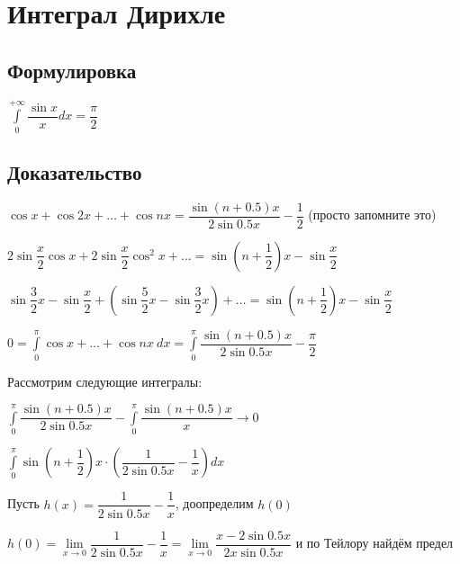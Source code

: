 \documentclass{article}
\begin{document}
    \newpage
    
    \section{Интеграл Дирихле}
    
        \subsection{Формулировка}
        
            $\int\limits^{+\infty}_0 \dfrac{\sin{x}}{x} dx = \dfrac{\pi}{2}$
            
        \subsection{Доказательство}
        
            $\cos{x} + \cos{2x} + \ldots + \cos{nx} = \dfrac{\sin{(n + 0.5)} x}{2 \sin{0.5 x}} - \dfrac{1}{2}$ (просто запомните это)
            
            $2 \sin {\dfrac{x}{2}} \cos{x} + 2 \sin{\dfrac{x}{2}} \cos^2{x} + \ldots = \sin{\left(n + \dfrac{1}{2} \right)}x - \sin{\dfrac{x}{2}}$
            
            $\sin {\dfrac{3}{2}x} - \sin {\dfrac{x}{2}} + \left( \sin {\dfrac{5}{2}} x - \sin {\dfrac{3}{2}} x \right) + \ldots = \sin {\left(n + \dfrac{1}{2} \right)x} - \sin {\dfrac{x}{2}}$
            
            $0 = \int\limits^{\pi}_0 \cos{x} + \ldots + \cos{nx} \ dx = \int\limits^{\pi}_0 \dfrac{\sin {(n + 0.5)} x}{2 \sin {0.5 x}} - \dfrac{\pi}{2}$
            
            Рассмотрим следующие интегралы:
            
            $\int\limits^{\pi}_0 \dfrac{\sin{(n + 0.5)}x}{2 \sin {0.5 x}} - \int\limits^{\pi}_0 \dfrac{\sin {(n + 0.5)}x}{x} \rightarrow 0$
            
            $\int\limits^{\pi}_0 \sin \left(n + \dfrac{1}{2} \right) x \cdot \left( \dfrac{1}{2 \sin {0.5 x}} - \dfrac{1}{x} \right) dx$
            
            Пусть $h(x) = \dfrac{1}{2 \sin {0.5 x}} - \dfrac{1}{x}$, доопределим $h(0)$
            
            $h(0) = \lim\limits_{x \rightarrow 0} \dfrac{1}{2 \sin {0.5x}} - \dfrac{1}{x} = \lim\limits_{x \rightarrow 0} \dfrac{x - 2 \sin {0.5 x}}{2 x \sin {0.5 x}}$ и по Тейлору найдём предел
            
\end{document}
